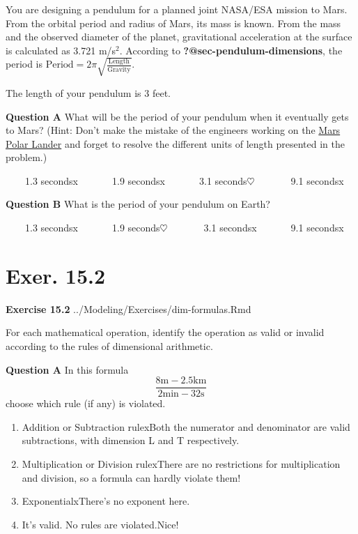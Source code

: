 \documentclass[
  letterpaper,
  DIV=11,
  numbers=noendperiod,
  oneside]{article}
\providecommand{\tightlist}{%
  \setlength{\itemsep}{0pt}\setlength{\parskip}{0pt}}\usepackage{longtable,booktabs,array}
\begin{document}
\begin{multicols}{2}
You are designing a pendulum for a planned joint NASA/ESA mission to
Mars. From the orbital period and radius of Mars, its mass is known.
From the mass and the observed diameter of the planet, gravitational
acceleration at the surface is calculated as 3.721 m/s\(^2\). According
to \textbf{?@sec-pendulum-dimensions}, the period is
\(\text{Period} = 2 \pi \sqrt{\frac{\text{Length}}{\text{Gravity}}}\).

The length of your pendulum is 3 feet.

\textbf{Question A} What will be the period of your pendulum when it
eventually gets to Mars? (Hint: Don't make the mistake of the engineers
working on the
\href{https://en.wikipedia.org/wiki/Mars_Polar_Lander}{Mars Polar
Lander} and forget to resolve the different units of length presented in
the problem.)

~~~~{1.3 seconds{x}}~~~~~~~{1.9 seconds{x}}~~~~~~~{3.1
seconds{\(\heartsuit\ \)}}~~~~~~~{9.1 seconds{x}}

\textbf{Question B} What is the period of your pendulum on Earth?

~~~~{1.3 seconds{x}}~~~~~~~{1.9 seconds{\(\heartsuit\ \)}}~~~~~~~{3.1
seconds{x}}~~~~~~~{9.1 seconds{x}}

\hypertarget{exer.-15.2}{%
\section*{Exer. 15.2}\label{exer.-15.2}}

\textbf{Exercise 15.2} ../Modeling/Exercises/dim-formulas.Rmd

For each mathematical operation, identify the operation as valid or
invalid according to the rules of dimensional arithmetic.

\textbf{Question A} In this formula
\[\frac{8 \text{m} - 2.5 \text{km}}{2 \text{min} - 32 \text{s}}\] choose
which rule (if any) is violated.

\begin{enumerate}
\def\labelenumi{\roman{enumi}.}
\tightlist
\item
  {Addition or Subtraction rule{xBoth the numerator and denominator
  are valid subtractions, with dimension L and T respectively.}}\\
\item
  {Multiplication or Division rule{xThere are no restrictions for
  multiplication and division, so a formula can hardly violate them!}}\\
\item
  {Exponential{xThere's no exponent here.}}\\
\item
  {It's valid. No rules are violated.{Nice!~}}
\end{enumerate}


\end{multicols}
\end{document}
